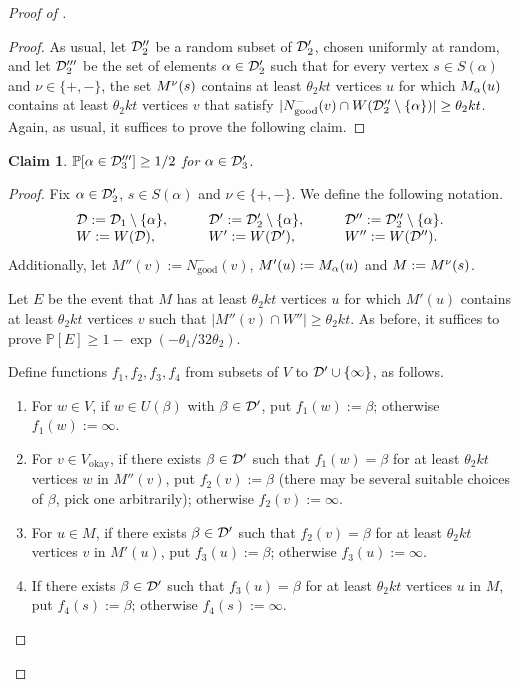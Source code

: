 \documentclass[english]{article}
\theoremstyle{plain}
\newtheorem{claim}[theorem]{Claim}
\theoremstyle{remark}
\def \Vo {V_{\okay}}
\def \Nmg{N^-_{\good}}
\renewcommand{\Pr}{\mathbb{P}}
\DeclareMathOperator{\good}{good}
\DeclareMathOperator{\okay}{okay}
\begin{document}
\begin{proof}[Proof of ]
\begin{proof}
				As usual, let $\mathcal{D}_2''$ be a random subset of $\mathcal{D}_2'$, chosen uniformly at random, and let $\mathcal{D}_2'''$ be the set of elements $\alpha \in \mathcal{D}_2'$ such that for every vertex $s \in S(\alpha)$ and $\nu \in \{+, -\}$, the set $M^{\nu}(s)$ contains at least $\theta_2 kt$ vertices $u$ for which $M_{\alpha}(u)$ contains at least $\theta_2 kt$ vertices $v$ that satisfy $|\Nmg(v) \cap W(\D_2'' \setminus \{\alpha\})| \ge \theta_2 kt$. Again, as usual, it suffices to prove the following claim.
			\end{proof}

			\begin{claim}
				$\Pr[\alpha \in \D_3'''] \ge 1/2$ for $\alpha \in \mathcal{D}_3'$.
			\end{claim}

			\begin{proof}
				Fix $\alpha \in \mathcal{D}_2'$, $s \in S(\alpha)$ and $\nu \in \{+, -\}$. We define the following notation.
				\begin{align*}
					\begin{array}{lll}
						\mathcal{D} := \mathcal{D}_1 \setminus \{\alpha\}, 
						& \qquad \mathcal{D}' := \mathcal{D}_2' \setminus \{\alpha\}, 
						& \qquad \mathcal{D}'' := \mathcal{D}_2'' \setminus \{\alpha\}. \\
						W := W(\mathcal{D}),
						& \qquad W' := W(\mathcal{D}'),
						& \qquad W'' := W(\mathcal{D}'').
					\end{array}
				\end{align*}
				Additionally, let $M''(v) := \Nmg(v)$, $M'(u) := M_{\alpha}(u)$ and $M := M^{\nu}(s)$.

				Let $E$ be the event that $M$ has at least $\theta_2 kt$ vertices $u$ for which $M'(u)$ contains at least $\theta_2 kt$ vertices $v$ such that $|M''(v) \cap W''| \ge \theta_2 kt$. As before, it suffices to prove $\Pr[E] \ge 1 - \exp(-\theta_1/32\theta_2)$.
				 
				Define functions $f_1, f_2, f_3, f_4$ from subsets of $V$ to $\mathcal{D}' \cup \{\infty\}$, as follows.
				\begin{enumerate}
					\item
						For $w \in V$, if $w \in U(\beta)$ with $\beta \in \mathcal{D}'$, put $f_1(w) := \beta$; otherwise $f_1(w) := \infty$.
					\item
						For $v \in \Vo$, if there exists $\beta \in \mathcal{D}'$ such that $f_1(w) = \beta$ for at least $\theta_2 kt$ vertices $w$ in $M''(v)$, put $f_2(v) := \beta$ (there may be several suitable choices of $\beta$, pick one arbitrarily); otherwise $f_2(v) := \infty$.
					\item
						For $u \in M$, if there exists $\beta \in \mathcal{D}'$ such that $f_2(v) = \beta$ for at least $\theta_2 kt$ vertices $v$ in $M'(u)$, put $f_3(u) := \beta$; otherwise $f_3(u) := \infty$. 
					\item
						If there exists $\beta \in \mathcal{D}'$ such that $f_3(u) = \beta$ for at least $\theta_2 kt$ vertices $u$ in $M$, put $f_4(s) := \beta$; otherwise $f_4(s) := \infty$.
				\end{enumerate}


\end{proof}
\end{proof}
\end{document}
